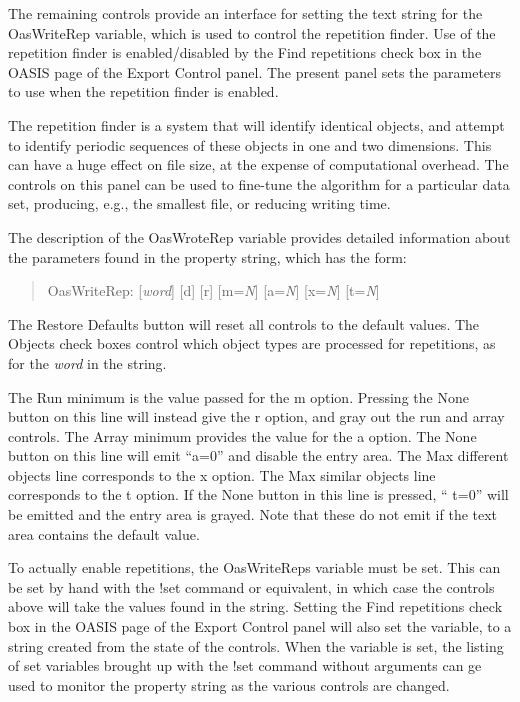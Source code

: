 The remaining controls provide an interface for setting the text
string for the {\et OasWriteRep} variable, which is used to control
the repetition finder.  Use of the repetition finder is
enabled/disabled by the {\cb Find repetitions} check box in the {\cb
OASIS} page of the {\cb Export Control} panel.  The present panel sets
the parameters to use when the repetition finder is enabled.

The repetition finder is a system that will identify identical
objects, and attempt to identify periodic sequences of these objects
in one and two dimensions.  This can have a huge effect on file size,
at the expense of computational overhead.  The controls on this panel
can be used to fine-tune the algorithm for a particular data set,
producing, e.g., the smallest file, or reducing writing time.

The description of the {\et OasWroteRep} variable provides detailed
information about the parameters found in the property string, which
has the form:
\begin{quote}
    {\et OasWriteRep}: [{\it word\/}] [{\vt d}] [{\vt r}]
     [{\vt m}={\it N\/}] [{\vt a}={\it N\/}] [{\vt x}={\it N\/}]
     [{\vt t}={\it N\/}]
\end{quote}

The {\cb Restore Defaults} button will reset all controls to the
default values.  The {\cb Objects} check boxes control which object
types are processed for repetitions, as for the {\it word} in the
string.

The {\cb Run minimum} is the value passed for the {\vt m} option. 
Pressing the {\cb None} button on this line will instead give the {\vt
r} option, and gray out the run and array controls.  The {\cb Array
minimum} provides the value for the {\vt a} option.  The {\cb None}
button on this line will emit ``{\vt a=0}'' and disable the entry
area.  The {\cb Max different objects} line corresponds to the {\vt x}
option.  The {\cb Max similar objects} line corresponds to the {\vt t}
option.  If the {\cb None} button in this line is pressed, ``{\vt
t=0}'' will be emitted and the entry area is grayed.  Note that these
do not emit if the text area contains the default value.

To actually enable repetitions, the {\et OasWriteReps} variable must
be set.  This can be set by hand with the {\cb !set} command or
equivalent, in which case the controls above will take the values
found in the string.  Setting the {\cb Find repetitions} check box in
the {\cb OASIS} page of the {\cb Export Control} panel will also set
the variable, to a string created from the state of the controls. 
When the variable is set, the listing of set variables brought up with
the {\cb !set} command without arguments can ge used to monitor the
property string as the various controls are changed.


